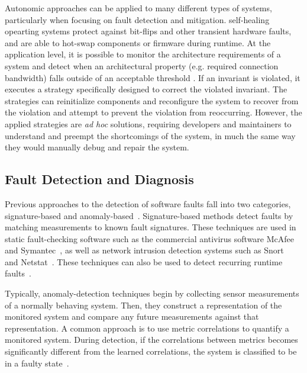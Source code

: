 Autonomic approaches can be applied to many different types of systems,
particularly when focusing on fault detection and mitigation. self-healing
opearting systems \cite{DBLP:journals/ibmsj/AppavooHSWSKAEGGMORSX03,4351383}
protect against bit-flips and other transient hardware faults, and are able to
hot-swap components or firmware during runtime. At the application level, it is
possible to monitor the architecture requirements of a system and detect when
an architectural property (e.g. required connection bandwidth) falls outside of
an acceptable threshold \cite{Garlan2004}. If an invariant is violated, it
executes a strategy specifically designed to correct the violated
invariant. The strategies can reinitialize components and reconfigure the
system to recover from the violation and attempt to prevent the violation from
reoccurring. However, the applied strategies are \emph{ad hoc} solutions,
requiring developers and maintainers to understand and preempt the shortcomings
of the system, in much the same way they would manually debug and repair the
system.

\subsection{Fault Detection and Diagnosis}
\label{sub:fault_detection}
Previous approaches to the detection of software faults fall into two
categories, signature-based and
anomaly-based~\cite{al-nashif2008}. Signature-based methods detect faults by
matching measurements to known fault signatures. These techniques are used in
static fault-checking software such as the commercial antivirus software
McAfee~\cite{Mcafee} and Symantec~\cite{symantec}, as well as network intrusion
detection systems such as Snort~\cite{Roesch1999} and
Netstat~\cite{Vigna1999}. These techniques can also be used to detect recurring
runtime faults~\cite{Brodie2005}.

Typically, anomaly-detection techniques begin by collecting sensor measurements
of a normally behaving system. Then, they construct a representation of the
monitored system and compare any future measurements against that
representation. A common approach is to use metric correlations to quantify a
monitored system. During detection, if the correlations between metrics becomes
significantly different from the learned correlations, the system is classified
to be in a faulty state~\cite{zhen2006,zhao2009,Cohen2004,Jiang2009}.

